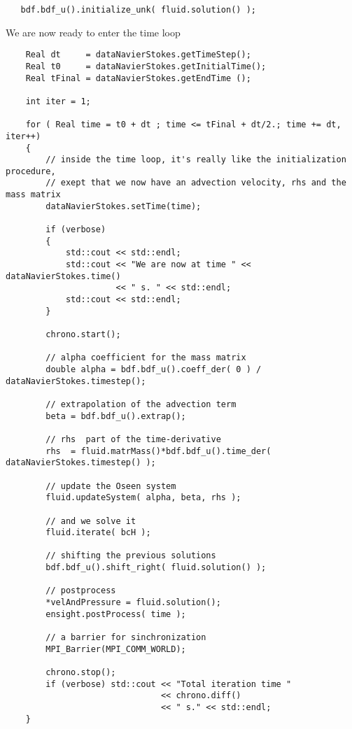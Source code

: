 \begin{verbatim}
   bdf.bdf_u().initialize_unk( fluid.solution() );
\end{verbatim}

We are now ready to enter the time loop 

\begin{verbatim}
    Real dt     = dataNavierStokes.getTimeStep();
    Real t0     = dataNavierStokes.getInitialTime();
    Real tFinal = dataNavierStokes.getEndTime ();

    int iter = 1;

    for ( Real time = t0 + dt ; time <= tFinal + dt/2.; time += dt, iter++)
    {
        // inside the time loop, it's really like the initialization procedure,
        // exept that we now have an advection velocity, rhs and the mass matrix
        dataNavierStokes.setTime(time);

        if (verbose)
        {
            std::cout << std::endl;
            std::cout << "We are now at time " << dataNavierStokes.time()
                      << " s. " << std::endl;
            std::cout << std::endl;
        }

        chrono.start();

        // alpha coefficient for the mass matrix
        double alpha = bdf.bdf_u().coeff_der( 0 ) / dataNavierStokes.timestep();

        // extrapolation of the advection term
        beta = bdf.bdf_u().extrap();

        // rhs  part of the time-derivative
        rhs  = fluid.matrMass()*bdf.bdf_u().time_der( dataNavierStokes.timestep() );

        // update the Oseen system
        fluid.updateSystem( alpha, beta, rhs );

        // and we solve it
        fluid.iterate( bcH );

        // shifting the previous solutions
        bdf.bdf_u().shift_right( fluid.solution() );

        // postprocess
        *velAndPressure = fluid.solution();
        ensight.postProcess( time );

        // a barrier for sinchronization 
        MPI_Barrier(MPI_COMM_WORLD);

        chrono.stop();
        if (verbose) std::cout << "Total iteration time "
                               << chrono.diff()
                               << " s." << std::endl;
    }

\end{verbatim}

